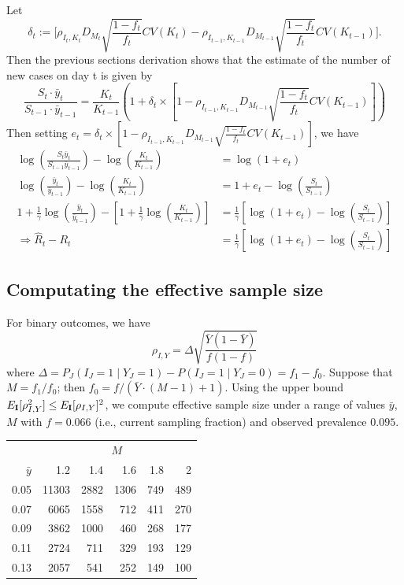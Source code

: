 \documentclass[12pt]{article}
\def\I{{\bf I}}
\def\bary{{\bar y}}
\begin{document}
Let
$$
\delta_t := \bigg[ \rho_{I_t,K_t} D_{M_t} \sqrt{\frac{1-f_t}{f_t}} CV (K_t)  -\rho_{I_{t-1},K_{t-1}} D_{M_{t-1}} \sqrt{\frac{1-f_t}{f_t}} CV (K_{t-1}) \bigg].
$$
Then the previous sections derivation shows that the estimate of the number of new cases on day t is given by
$$
\frac{S_t \cdot \bar y_t}{S_{t-1} \cdot \bar y_{t-1}} =
\frac{K_t}{K_{t-1}} \left( 1 + \delta_t \times \left[ 1 - \rho_{I_{t-1},K_{t-1}} D_{M_{t-1}} \sqrt{\frac{1-f_t}{f_t}} CV (K_{t-1}) \right] \right)
$$
Then setting $e_t = \delta_t \times [1 - \rho_{I_{t-1},K_{t-1}} D_{M_{t-1}} \sqrt{\frac{1-f_t}{f_t}} CV (K_{t-1}) ]$, we have
$$
\begin{aligned}
\log \left( \frac{S_t \bar y_t}{S_{t-1} \bar y_{t-1}} \right) - \log \left( \frac{K_t}{K_{t-1}} \right) &= \log (1 + e_t) \\
\log \left( \frac{\bar y_t}{\bar y_{t-1}} \right) - \log \left( \frac{K_t}{K_{t-1}} \right) &= 1 + e_t - \log \left( \frac{S_t}{S_{t-1}} \right) \\
1 + \frac{1}{\gamma} \log \left( \frac{\bar y_t}{\bar y_{t-1}} \right) - \left[ 1 + \frac{1}{\gamma} \log \left( \frac{K_t}{K_{t-1}} \right) \right] &= \frac{1}{\gamma} \left[ \log \left( 1 + e_t \right) - \log \left( \frac{S_{t}}{S_{t-1}} \right) \right] \\
\Rightarrow \hat R_t - R_t &= \frac{1}{\gamma} \left[ \log \left( 1 + e_t \right) - \log \left( \frac{S_{t}}{S_{t-1}} \right) \right]
\end{aligned}
$$



\subsection*{Computating the effective sample size}
\label{section:effss}

For binary outcomes, we have
\begin{equation} \label{eq:binaryrho}
\rho_{I,Y} = \Delta \sqrt{\frac{\bar Y (1 - \bar Y)}{f (1-f)} }
\end{equation}
where $\Delta = P_J (I_J = 1 \mid Y_J = 1) - P(I_J = 1 \mid Y_J = 0) = f_1 - f_0$.  Suppose that $M = f_1/f_0$; then $f_0 = f / (\bar Y \cdot (M-1) + 1)$.  Using the upper bound $E_{\I} [ \rho_{I,Y}^2 ] \leq E_{\I} [\rho_{I,Y} ]^2$, we compute effective sample size under a range of values $\bary$, $M$ with $f = 0.066$ (i.e., current sampling fraction) and observed prevalence $0.095$.

\begin{table}[ht]
\centering
\begin{tabular}{rrrrrr}
& \multicolumn{5}{c}{$M$} \\ \cline{2-6}
$\bar y$ & 1.2 & 1.4 & 1.6 & 1.8 & 2 \\
  \hline
0.05 & 11303 & 2882 & 1306 & 749 & 489 \\
  0.07 & 6065 & 1558 & 712 & 411 & 270 \\
  0.09 & 3862 & 1000 & 460 & 268 & 177 \\
  0.11 & 2724 & 711 & 329 & 193 & 129 \\
  0.13 & 2057 & 541 & 252 & 149 & 100 \\
   \hline
\end{tabular}
\end{table}
\end{document}
